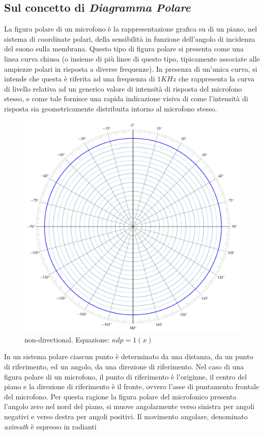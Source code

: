 \subsection{Sul concetto di \emph{Diagramma Polare}}
\label{sec:polarplot}

La figura polare di un microfono è la rappresentazione grafica su di un piano,
nel sistema di coordinate polari, della sensibilità in funzione dell'angolo di
incidenza del suono sulla membrana. Questo tipo di figura polare si presenta
come una linea curva chiusa (o insieme di più linee di questo tipo, tipicamente
associate alle ampiezze polari in risposta a diverse frequenze). In presenza di
un’unica curva, si intende che questa è riferita ad una frequenza di $1KHz$ che
rappresenta la curva di livello relativa ad un generico valore di intensità di
risposta del microfono stesso, e come tale fornisce una rapida indicazione
visiva di come l'intensità di risposta sia geometricamente distribuita intorno
al microfono stesso.

\begin{figure}[t]
\centering
\includegraphics[width=1\columnwidth]{CAPITOLI/_TIKZ/POLAR/omni}
\caption{non-directional. Equazione: $ndp = 1(x)$}
\label{polar:omni}
\end{figure}

In un sistema polare ciascun punto è
determinato da una distanza, da un punto di riferimento, ed un angolo, da una
direzione di riferimento. Nel caso di una figura polare di un microfono, il
punto di riferimento è l'originne, il centro del piano e la direzione di
riferimento è il fronte, ovvero l'asse di puntamento frontale del microfono. Per
questa ragione la figura polare del microfonico presenta l'angolo zero
nel nord del piano, si muove angolarmente verso sinistra per angoli
negativi e verso destra per angoli positivi. Il movimento angolare, denominato
\emph{azimuth} è espresso in radianti

